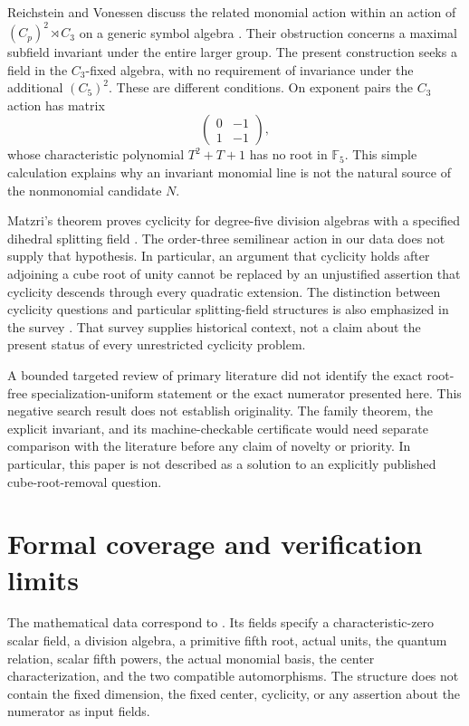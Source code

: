\documentclass[11pt,letterpaper]{article}
\theoremstyle{definition}
\theoremstyle{remark}
\newcommand{\FF}{\mathbb F}
\newcommand{\code}[1]{\texttt{\detokenize{#1}}}
\begin{document}
Reichstein and Vonessen discuss the related monomial action within an
action of $(C_p)^2\rtimes C_3$ on a generic symbol algebra
\cite[Section~15, especially Proposition~15.3]{ReichsteinVonessen}.
Their obstruction concerns a maximal subfield invariant under the entire
larger group. The present construction seeks a field in the $C_3$-fixed
algebra, with no requirement of invariance under the additional $(C_5)^2$.
These are different conditions. On exponent pairs the $C_3$ action has
matrix
\[
\begin{pmatrix}0&-1\\1&-1\end{pmatrix},
\]
whose characteristic polynomial $T^2+T+1$ has no root in $\FF_5$.
This simple calculation explains why an invariant monomial line is not the
natural source of the nonmonomial candidate $N$.

Matzri's theorem proves cyclicity for degree-five division algebras with
a specified dihedral splitting field
\cite[Theorem~3.2]{Matzri}. The order-three semilinear action in our data
does not supply that hypothesis. In particular, an argument that cyclicity
holds after adjoining a cube root of unity cannot be replaced by an
unjustified assertion that cyclicity descends through every quadratic
extension. The distinction between cyclicity questions and particular
splitting-field structures is also emphasized in the survey
\cite[Section~2]{ABGV}. That survey supplies historical context, not a
claim about the present status of every unrestricted cyclicity problem.

A bounded targeted review of primary literature did not identify the exact
root-free specialization-uniform statement or the exact numerator presented
here. This negative search result does not establish originality. The
family theorem, the explicit invariant, and its machine-checkable
certificate would need separate comparison with the literature before any
claim of novelty or priority. In particular, this paper is not described
as a solution to an explicitly published cube-root-removal question.

\section{Formal coverage and verification limits}\label{sec:formal}

The mathematical data correspond to
\code{PrimeFiveFamily.SymbolFamily}. Its fields specify a characteristic-zero
scalar field, a division algebra, a primitive fifth root, actual units,
the quantum relation, scalar fifth powers, the actual monomial basis,
the center characterization, and the two compatible automorphisms.
The structure does not contain the fixed dimension, the fixed center,
cyclicity, or any assertion about the numerator as input fields.
\end{document}
